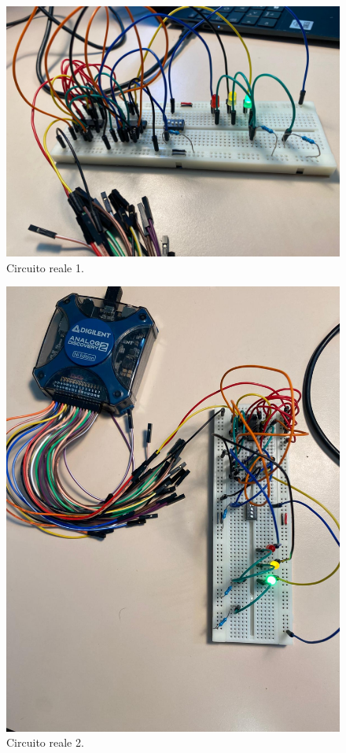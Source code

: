 \documentclass[10pt,a4paper]{article}
\begin{document}
\begin{figure}
    \begin{center}
    \includegraphics[scale=0.20]{WhatsApp Image 2024-04-30 at 15.05.28 (1).jpeg}
    \caption{Circuito reale 1.}
    \label{fig6}
    \end{center}
\end{figure}

\begin{figure}
    \begin{center}
    \includegraphics[scale=0.20]{WhatsApp Image 2024-04-30 at 15.05.28.jpeg}
    \caption{Circuito reale 2.}
    \label{fig6}
    \end{center}
\end{figure}
\end{document}
